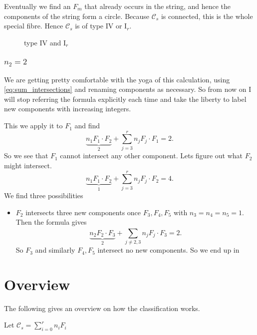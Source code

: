 Eventually we find an $F_m$ that already occurs in the string, and hence the components of the string form a circle. Because $\mathcal{C} _s$ is connected, this is the whole special fibre.  Hence $\mathcal{C} _s $ is of type $\text{IV}$ or $\text{I}_{r}$. 

\begin{figure}[ht]
    \centering
    \caption{type IV and $\text{I}_r$}
    \label{fig:type-iv-and-ir}
\end{figure}

\subsubsection{$n_2 = 2$} 
We are getting pretty comfortable with the yoga of this calculation,  using \eqref{eq:sum_intersections} and renaming components as necessary. So from now on I will stop referring the formula explicitly each time and take the liberty to label new components with increasing integers.

This we apply it to $F_1$ and find \[
	\underbrace{n_1 F_1 \cdot  F_2}_{2} + \sum_{j = 3}^{r} n_j F_j\cdot F_1 = 2
.\] 
So we see that $F_1$ cannot intersect any other component. 
Lets figure out what $F_2$ might intersect. 
\[
	\underbrace{n_1 F_1 \cdot F_2}_1 + \sum_{j = 3}^{r} n_j F_j \cdot F_2 = 4
.\] 
We find three possibilities
\begin{itemize}
	\item $F_2$ intersects three new components once $F_3, F_4, F_5$ with $n_3 = n_4 = n_5 = 1$. 
		Then the formula gives \[
			\underbrace{n_2F_2 \cdot  F_3}_{2} + \sum_{j \ne 2,3}^{}n_j F_j \cdot  F_3 = 2 
		.\] 
		So $F_3$ and similarly $F_4, F_5$ intersect no new components. So we end up in 
\end{itemize}



\section{Overview} \label{sec:overview}
The following gives an overview on how the classification works. 


Let $\mathcal{C} _s = \sum_{i = 0}^{r} n_i F_i $


